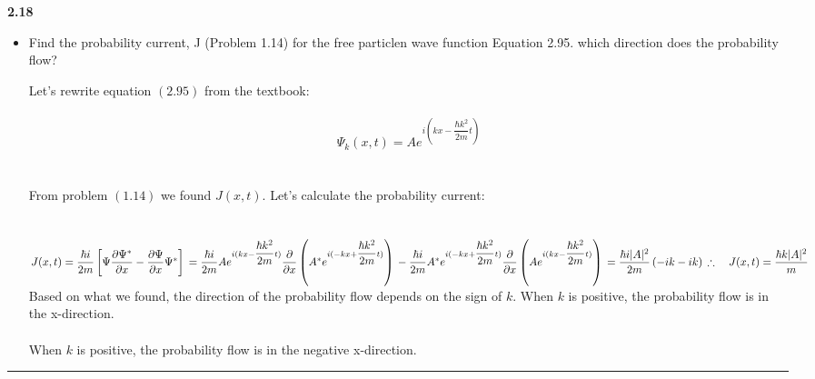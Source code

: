 \documentclass[fleqn]{article}
\begin{document}
  \textbf{2.18}
  \begin{itemize}
    \item Find the probability current, J (Problem 1.14) for the free particlen wave function Equation 2.95. which
    direction does the probability flow?

      \textcolor{hwColor}{
        Let's rewrite equation $(2.95)$ from the textbook: \\
        \\
        $$\Psi_k(x,t)=A e^{i(kx-\dfrac{\hbar k^2}{2m}t)}$$ \\
        \\
        From problem $(1.14)$ we found $J(x,t)$. Let's calculate the probability current: \\
        \\
        \\
        $
          J(x,t)=\dfrac{\hbar i}{2m} \left[\Psi \dfrac{\partial \Psi^*}{\partial x}-\dfrac{\partial \Psi}{\partial x}\Psi^*\right] \\
          \\
          \\
          =\dfrac{\hbar i}{2m} A e^{i(kx-\dfrac{\hbar k^2}{2m}t)} \dfrac{\partial }{\partial x} \left(A^* e^{i(-kx+\dfrac{\hbar k^2}{2m}t)}\right) \\
          -\dfrac{\hbar i}{2m} A^* e^{i(-kx+\dfrac{\hbar k^2}{2m}t)} \dfrac{\partial }{\partial x} \left(A e^{i(kx-\dfrac{\hbar k^2}{2m}t)}\right) \\
          \\
          \\
          =\dfrac{\hbar i |A|^2}{2m} \left(-ik-ik\right) \\
          \\
          \\
          \\
          \therefore ~~~  J(x,t)=\dfrac{\hbar k |A|^2}{m} \\ \\
        $
        Based on what we found, the direction of the probability flow depends on the sign of $k$. When $k$ is positive, 
        the probability flow is in the x-direction. \\
        \\
        When $k$ is positive, the probability flow is in the negative x-direction. 
      }

  \end{itemize}

  \rule{15cm}{1pt}
\end{document}

